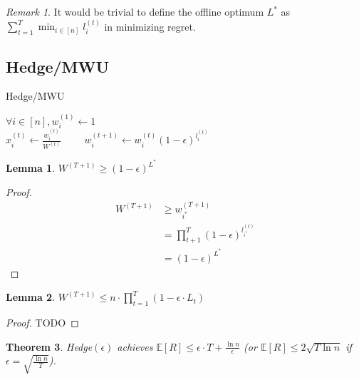 \documentclass[11pt]{article}
\newtheorem{theorem}{Theorem}[section]
\newtheorem{lemma}[theorem]{Lemma}
\theoremstyle{definition}
\theoremstyle{remark}
\newtheorem*{remark}{Remark}
\begin{document}
\begin{remark}
It would be trivial to define the offline optimum $L^*$ as $\sum_{t=1}^T \min_{i \in [n]} l_i^{(t)}$ in minimizing regret.
\end{remark}

\subsection{Hedge/MWU}
\begin{algorithm}
    \caption{Hedge/MWU}
    
    
    \DontPrintSemicolon
    
    $\forall i \in [n], w_i^{(1)} \gets 1$ \\
    $x_i^{(t)} \gets \frac{w_i^{(t)}}{W^{(t)}} \qquad$ 
    $w_i^{(t+1)} \gets w_i^{(t)} (1-\epsilon)^{l_i^{(t)}}$
\end{algorithm}

\begin{lemma}
$W^{(T+1)} \geq (1-\epsilon)^{L^*}$
\end{lemma}

\begin{proof}
\begin{align*}
W^{(T+1)} &\geq w_{i^*}^{(T+1)} \\
& = \prod_{t+1}^T (1-\epsilon)^{l_{i^*}^{(t)}} \\
& = (1-\epsilon)^{L^*}
\end{align*}
\end{proof}

\begin{lemma}
$W^{(T+1)} \leq n \cdot \prod_{t=1}^{T} (1 - \epsilon \cdot L_t)$
\end{lemma}

\begin{proof}
TODO
\end{proof}

\begin{theorem}
Hedge$(\epsilon)$ achieves $\mathbb{E}[R] \leq \epsilon \cdot T + \frac{\ln n}{\epsilon}$ (or $\mathbb{E}[R] \leq 2 \sqrt{T \ln n}$ if $\epsilon = \sqrt{\frac{\ln n}{T}}$).
\end{theorem}
\end{document}

